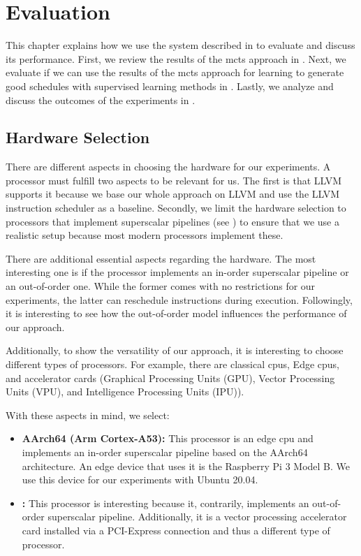 \chapter{Evaluation}
\label{sec:eval}
This chapter explains how we use the system described in  to evaluate and discuss its performance.
First, we review the results of the \ac{mcts} approach in .
Next, we evaluate if we can use the results of the \ac{mcts} approach for learning to generate good schedules with supervised learning methods in .
Lastly, we analyze and discuss the outcomes of the experiments in .

\section{Hardware Selection}
\label{sec:eval:hw}
There are different aspects in choosing the hardware for our experiments.
A processor must fulfill two aspects to be relevant for us.
The first is that LLVM supports it because we base our whole approach on LLVM and use the LLVM instruction scheduler as a baseline.
Secondly, we limit the hardware selection to processors that implement superscalar pipelines (see ) to ensure that we use a realistic setup because most modern processors implement these.

There are additional essential aspects regarding the hardware.
The most interesting one is if the processor implements an in-order superscalar pipeline or an out-of-order one.
While the former comes with no restrictions for our experiments, the latter can reschedule instructions during execution.
Followingly, it is interesting to see how the out-of-order model influences the performance of our approach.

Additionally, to show the versatility of our approach, it is interesting to choose different types of processors.
For example, there are classical \acp{cpu}, Edge \acp{cpu}, and accelerator cards (\eg Graphical Processing Units (GPU), Vector Processing Units (VPU), and Intelligence Processing Units (IPU)).

With these aspects in mind, we select:
\begin{itemize}
    \item \textbf{AArch64 (Arm Cortex-A53):} This processor is an edge \ac{cpu} and implements an in-order superscalar pipeline based on the AArch64 architecture.
    An edge device that uses it is the Raspberry Pi 3 Model B.
    We use this device for our experiments with Ubuntu 20.04.
    \item \textbf{\aurora{}:} This processor is interesting because it, contrarily, implements an out-of-order superscalar pipeline. 
    Additionally, it is a vector processing accelerator card installed via a PCI-Express connection and thus a different type of processor.
\end{itemize}

